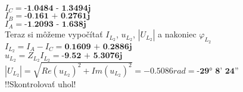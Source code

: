 $I_C = \textbf{-1.0484 - 1.3494j}$ \\
$I_B = \textbf{-0.161 + 0.2761j}$ \\
$I_A = \textbf{-1.2093 - 1.638j}$ \\
\newline
Teraz si môžeme vypočítať $I_{L_2}$, $u_{L_2}$, $|U_{L_2}|$ a nakoniec $\varphi_{L_2}$ \\
$I_{L_2} = I_A - I_C = \textbf{0.1609 + 0.2886j}$ \\
$u_{L_2} = Z_{L_2}I_{L_2} = \textbf{-9.52 + 5.3076j}$ \\
$|U_{L_2}| = \sqrt{Re(u_{L_2})^2 + Im(u_{L_2})^2} = -0.5086rad = \textbf{-29° 8' 24''}$ \\
\newline
!!Skontrolovať uhol!
